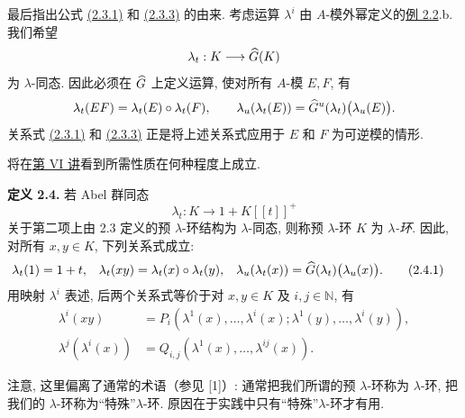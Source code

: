 最后指出公式 \hyperlink{sga6.e05.eq.2-3-1}{(2.3.1)} 和 \hyperlink{sga6.e05.eq.2-3-3}{(2.3.3)} 的由来. 考虑运算 \(\lambda^i\) 由 \(A\)-模外幂定义的\hyperlink{sga6.e05.ex.2-2}{例 2.2}.b. 我们希望
\[
  \lambda_t:K\longrightarrow \widehat G(K)
\]
为 \(\lambda\)-同态. 因此必须在 \(\widehat G\) 上定义运算, 使对所有 \(A\)-模 \(E,F\), 有
\[
  \lambda_t(EF)=\lambda_t(E)\circ\lambda_t(F),\qquad
  \lambda_u(\lambda_t(E))=\widehat G^u(\lambda_t)\bigl(\lambda_u(E)\bigr).
\]
关系式 \hyperlink{sga6.e05.eq.2-3-1}{(2.3.1)} 和 \hyperlink{sga6.e05.eq.2-3-3}{(2.3.3)} 正是将上述关系式应用于 \(E\) 和 \(F\) 为可逆模的情形.

将在\hyperlink{sga6.e06.expose}{第 VI 讲}看到所需性质在何种程度上成立.

\textbf{定义 2.4.} 若 Abel 群同态
\[
  \lambda_t:K\longrightarrow 1+K[[t]]^+
\]
关于第二项上由 2.3 定义的预 \(\lambda\)-环结构为 \(\lambda\)-同态, 则称预 \(\lambda\)-环 \(K\) 为 \emph{\(\lambda\)-环}. 因此, 对所有 \(x,y\in K\), 下列关系式成立:
\begin{align}
  \lambda_t(1)&=1+t,&
  \lambda_t(xy)&=\lambda_t(x)\circ\lambda_t(y),&
  \lambda_u(\lambda_t(x))&=\widehat G(\lambda_t)\bigl(\lambda_u(x)\bigr).
  \tag{2.4.1}
\end{align}
用映射 \(\lambda^i\) 表述, 后两个关系式等价于对 \(x,y\in K\) 及 \(i,j\in\mathbb N\), 有
\begin{equation}\tag{2.4.2}
 \begin{aligned}
 \lambda^i(xy)
 &=P_i(\lambda^1(x),\ldots,\lambda^i(x);
       \lambda^1(y),\ldots,\lambda^i(y)),\\
 \lambda^j(\lambda^i(x))
 &=Q_{i,j}(\lambda^1(x),\ldots,\lambda^{ij}(x)).
 \end{aligned}
\end{equation}

注意, 这里偏离了通常的术语（参见 [1]）: 通常把我们所谓的预 \(\lambda\)-环称为 \(\lambda\)-环, 把我们的 \(\lambda\)-环称为“特殊”\(\lambda\)-环. 原因在于实践中只有“特殊”\(\lambda\)-环才有用.

